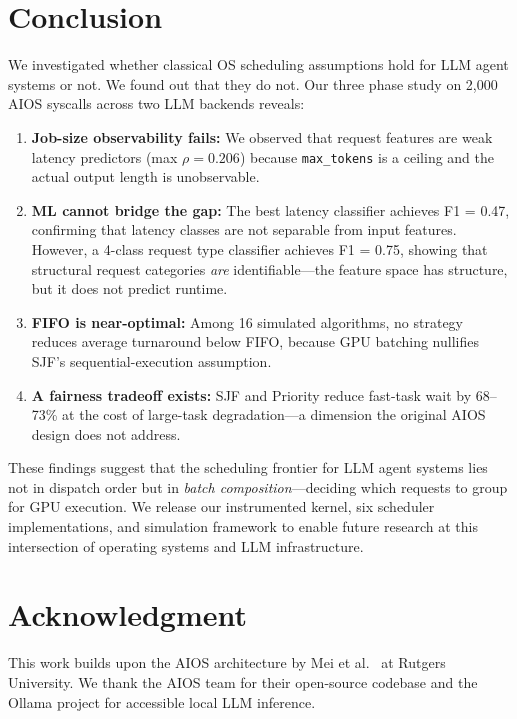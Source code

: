\documentclass[conference]{IEEEtran}
\begin{document}
\section{Conclusion}

We investigated whether classical OS scheduling assumptions hold for LLM agent systems or not. We found out that they do not. Our three phase study on 2,000 AIOS syscalls across two LLM backends reveals:

\begin{enumerate}
    \item \textbf{Job-size observability fails:} We observed that request features are weak latency predictors (max $\rho = 0.206$) because \texttt{max\_tokens} is a ceiling and the actual output length is unobservable.
    \item \textbf{ML cannot bridge the gap:} The best latency classifier achieves F1 = 0.47, confirming that latency classes are not separable from input features. However, a 4-class request type classifier achieves F1 = 0.75, showing that structural request categories \textit{are} identifiable---the feature space has structure, but it does not predict runtime.
    \item \textbf{FIFO is near-optimal:} Among 16 simulated algorithms, no strategy reduces average turnaround below FIFO, because GPU batching nullifies SJF's sequential-execution assumption.
    \item \textbf{A fairness tradeoff exists:} SJF and Priority reduce fast-task wait by 68--73\% at the cost of large-task degradation---a dimension the original AIOS design does not address.
\end{enumerate}

These findings suggest that the scheduling frontier for LLM agent systems lies not in dispatch order but in \textit{batch composition}---deciding which requests to group for GPU execution. We release our instrumented kernel, six scheduler implementations, and simulation framework to enable future research at this intersection of operating systems and LLM infrastructure.

\section*{Acknowledgment}
This work builds upon the AIOS architecture by Mei et al.~\cite{mei2025aios} at Rutgers University. We thank the AIOS team for their open-source codebase and the Ollama project for accessible local LLM inference.
\end{document}
